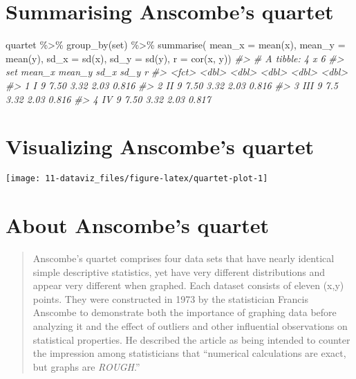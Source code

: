 \documentclass[
]{book}
\newenvironment{Shaded}{\begin{snugshade}}{\end{snugshade}}
\newcommand{\AttributeTok}[1]{\textcolor[rgb]{0.77,0.63,0.00}{#1}}
\newcommand{\CommentTok}[1]{\textcolor[rgb]{0.56,0.35,0.01}{\textit{#1}}}
\newcommand{\FunctionTok}[1]{\textcolor[rgb]{0.00,0.00,0.00}{#1}}
\newcommand{\NormalTok}[1]{#1}
\newcommand{\SpecialCharTok}[1]{\textcolor[rgb]{0.00,0.00,0.00}{#1}}
\theoremstyle{definition}
\theoremstyle{definition}
\theoremstyle{definition}
\theoremstyle{definition}
\theoremstyle{remark}
\begin{document}
\hypertarget{summarising-anscombes-quartet-1}{%
\section{Summarising Anscombe's quartet}\label{summarising-anscombes-quartet-1}}

\begin{Shaded}
\begin{Highlighting}[]
\NormalTok{quartet }\SpecialCharTok{\%\textgreater{}\%}
  \FunctionTok{group\_by}\NormalTok{(set) }\SpecialCharTok{\%\textgreater{}\%}
  \FunctionTok{summarise}\NormalTok{(}
    \AttributeTok{mean\_x =} \FunctionTok{mean}\NormalTok{(x), }
    \AttributeTok{mean\_y =} \FunctionTok{mean}\NormalTok{(y),}
    \AttributeTok{sd\_x =} \FunctionTok{sd}\NormalTok{(x),}
    \AttributeTok{sd\_y =} \FunctionTok{sd}\NormalTok{(y),}
    \AttributeTok{r =} \FunctionTok{cor}\NormalTok{(x, y))}
\CommentTok{\#\textgreater{} \# A tibble: 4 x 6}
\CommentTok{\#\textgreater{}   set   mean\_x mean\_y  sd\_x  sd\_y     r}
\CommentTok{\#\textgreater{}   \textless{}fct\textgreater{}  \textless{}dbl\textgreater{}  \textless{}dbl\textgreater{} \textless{}dbl\textgreater{} \textless{}dbl\textgreater{} \textless{}dbl\textgreater{}}
\CommentTok{\#\textgreater{} 1 I          9   7.50  3.32  2.03 0.816}
\CommentTok{\#\textgreater{} 2 II         9   7.50  3.32  2.03 0.816}
\CommentTok{\#\textgreater{} 3 III        9   7.5   3.32  2.03 0.816}
\CommentTok{\#\textgreater{} 4 IV         9   7.50  3.32  2.03 0.817}
\end{Highlighting}
\end{Shaded}

\hypertarget{visualizing-anscombes-quartet-1}{%
\section{Visualizing Anscombe's quartet}\label{visualizing-anscombes-quartet-1}}

\begin{center}\texttt{[image: 11-dataviz\_files/figure-latex/quartet-plot-1]} \end{center}

\hypertarget{about-anscombes-quartet-1}{%
\section{About Anscombe's quartet}\label{about-anscombes-quartet-1}}

\begin{quote}
Anscombe's quartet comprises four data sets that have nearly identical simple descriptive statistics, yet have very different distributions and appear very different when graphed. Each dataset consists of eleven (x,y) points. They were constructed in 1973 by the statistician Francis Anscombe to demonstrate both the importance of graphing data before analyzing it and the effect of outliers and other influential observations on statistical properties. He described the article as being intended to counter the impression among statisticians that ``numerical calculations are exact, but graphs are \emph{ROUGH}.''
\end{quote}
\end{document}
